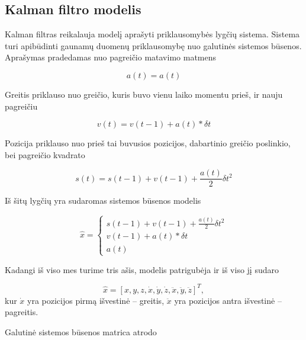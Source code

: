 \subsection{Kalman filtro modelis}

Kalman filtras reikalauja modelį aprašyti priklausomybės lygčių sistema.
Sistema turi apibūdinti gaunamų duomenų priklausomybę nuo galutinės sistemos būsenos.
Aprašymas pradedamas nuo pagreičio matavimo matmens

\begin{equation}
    a(t) = a(t)
\end{equation}

Greitis priklauso nuo greičio, kuris buvo vienu laiko momentu prieš, ir nauju pagreičiu

\begin{equation}
    v(t) = v(t-1) + a(t) * \delta t
\end{equation}

Pozicija priklauso nuo prieš tai buvusios pozicijos, dabartinio greičio poslinkio, bei pagreičio kvadrato

\begin{equation}
    s(t) = s(t-1) + v(t-1) + \frac{a(t)}{2}\delta t^2
\end{equation}

Iš šitų lygčių yra sudaromas sistemos būsenos modelis

\begin{equation}
    \hat{x} = \begin{cases}
        s(t-1) + v(t-1) + \frac{a(t)}{2}\delta t^2 \\
        v(t-1) + a(t) * \delta t \\
        a(t)
    \end{cases}
\end{equation}

Kadangi iš viso mes turime tris ašis, modelis patrigubėja ir iš viso jį sudaro

\begin{equation}
    \hat{x} = [ x, y, z, \dot{x}, \dot{y}, \dot{z}, \ddot{x}, \ddot{y}, \ddot{z}]^T,
\end{equation}
kur $\dot{x}$ yra pozicijos pirmą išvestinė -- greitis, $\ddot{x}$ yra pozicijos antra išvestinė -- pagreitis.

Galutinė sistemos būsenos matrica atrodo

